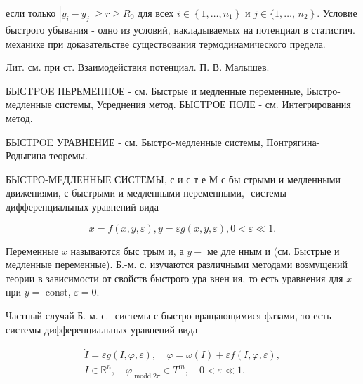 \documentclass[10pt]{article}
\begin{document}
если только $\left|y_{i}-y_{j}\right| \geqslant r \geqslant R_{0}$ для всех $i \in\left\{1, \ldots, n_{1}\right\}$ и $j \in\{1, \ldots$, $\left.n_{2}\right\}$. Условие быстрого убывания - одно из условий, накладываемых на потенциал в статистич. механике при доказательстве существования термодинамического предела.



Лит. см. при ст. Взаимодействия потенциал. П. В. Малышев.



БЫСTPOE ПЕРЕМЕНHОЕ - см. Быстрые и медленные переменные, Быстро-медленные системы, Усреднения метод. БЫСТPОЕ ПОЛЕ - см. Интегрирования метод.



БЫСТPOE УРАВНЕНИЕ - см. Быстро-медленные системы, Понтрягина-Родыгина теоремы.



БЫСТРО-МЕДЛЕННЫЕ СИСТЕМЫ, с и с т е М с бы стрыми и медленными движениями, с быстрыми и медленными переменными,- системы дифференциальных уравнений вида



\[

\dot{x}=f(x, y, \varepsilon), \dot{y}=\varepsilon g(x, y, \varepsilon), 0<\varepsilon \ll 1 .

\]



Переменные $x$ называются быс трым и, а $y-$ ме дле нным и (см. Быстрые и медленные переменные). Б.-м. с. изучаются различными методами возмущений теории в зависимости от свойств быстрого ура внен ия, то есть уравнения для $x$ при $y=$ const, $\varepsilon=0$.



Частный случай Б.-м. с.- системы с быстро вращающимися фазами, то есть системы дифференциальных уравнений вида



\[

\begin{gathered}

\dot{I}=\varepsilon g(I, \varphi, \varepsilon), \quad \dot{\varphi}=\omega(I)+\varepsilon f(I, \varphi, \varepsilon), \\

I \in \mathbb{R}^{n}, \quad \varphi_{\operatorname{modd} 2 \pi} \in T^{m}, \quad 0<\varepsilon \ll 1 .

\end{gathered}

\]
\end{document}
